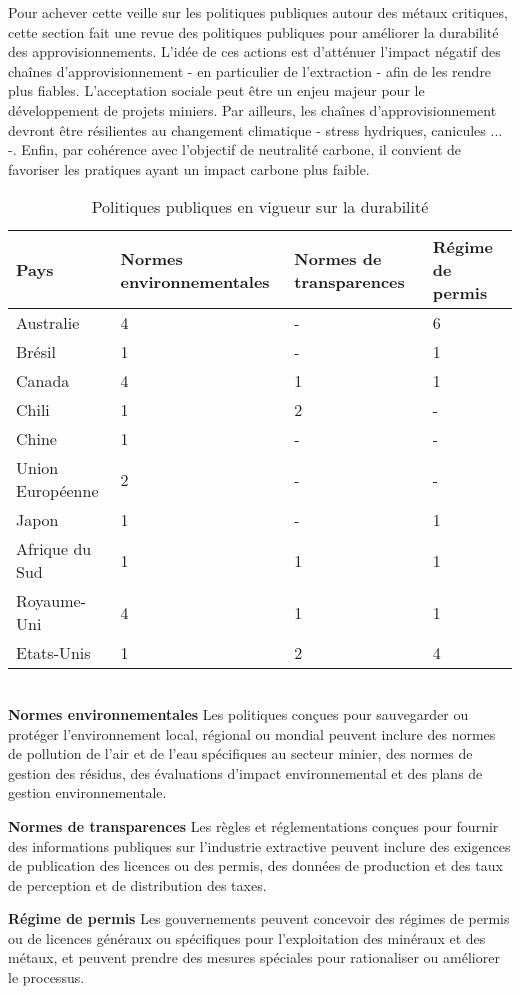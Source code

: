 Pour achever cette veille sur les politiques publiques autour des métaux critiques, cette section fait une revue des politiques publiques pour améliorer la durabilité des approvisionnements. L'idée de ces actions est d'atténuer l'impact négatif des chaînes d'approvisionnement - en particulier de l'extraction - afin de les rendre plus fiables. L'acceptation sociale peut être un enjeu majeur pour le développement de projets miniers. Par ailleurs, les chaînes d'approvisionnement devront être résilientes au changement climatique - stress hydriques, canicules ... -. Enfin, par cohérence avec l'objectif de neutralité carbone, il convient de favoriser les pratiques ayant un impact carbone plus faible.
\begin{table}[!h]
\centering
\begin{tabular}{ |p{3cm}||p{3.5cm}|p{3.5cm}|p{3.5cm}|  }
 \hline
 Pays & Normes environnementales & Normes de transparences & Régime de permis\\
 \hline
 Australie          & 4     & - & 6\\
 Brésil             & 1     & - & 1 \\
 Canada             & 4     & 1 & 1 \\
 Chili              & 1     & 2 & - \\
 Chine              & 1     & - & - \\
 Union Européenne   & 2     & - & - \\
 Japon              & 1     & - & 1 \\
 Afrique du Sud     & 1     & 1 & 1 \\
 Royaume-Uni        & 4     & 1 & 1 \\
 Etats-Unis         & 1     & 2 & 4 \\
 \hline
\end{tabular}
    \caption{Politiques publiques en vigueur sur la durabilité}
    \label{tab:durabilité}
\end{table}
~\\
\textbf{Normes environnementales}\smallbreak
Les politiques conçues pour sauvegarder ou protéger l'environnement local, régional ou mondial peuvent inclure des normes de pollution de l'air et de l'eau spécifiques au secteur minier, des normes de gestion des résidus, des évaluations d'impact environnemental et des plans de gestion environnementale.\bigbreak

\textbf{Normes de transparences}\smallbreak
Les règles et réglementations conçues pour fournir des informations publiques sur l'industrie extractive peuvent inclure des exigences de publication des licences ou des permis, des données de production et des taux de perception et de distribution des taxes.\bigbreak

\textbf{Régime de permis}\smallbreak
Les gouvernements peuvent concevoir des régimes de permis ou de licences généraux ou spécifiques pour l'exploitation des minéraux et des métaux, et peuvent prendre des mesures spéciales pour rationaliser ou améliorer le processus.